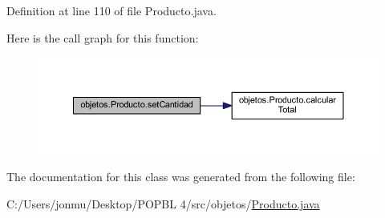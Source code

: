 Definition at line 110 of file Producto.\+java.

Here is the call graph for this function\+:\nopagebreak
\begin{figure}[H]
\begin{center}
\leavevmode
\includegraphics[width=350pt]{classobjetos_1_1_producto_ae14dcc26bdc312a512627177d4e7e442_cgraph}
\end{center}
\end{figure}


The documentation for this class was generated from the following file\+:\begin{DoxyCompactItemize}
\item 
C\+:/\+Users/jonmu/\+Desktop/\+P\+O\+P\+B\+L 4/src/objetos/\mbox{\hyperlink{_producto_8java}{Producto.\+java}}\end{DoxyCompactItemize}
